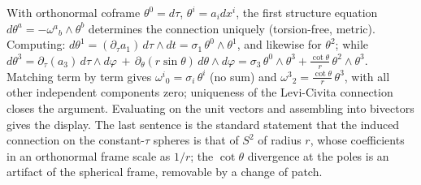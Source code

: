With orthonormal coframe $\theta^0 = d\tau$, $\theta^i = a_i dx^i$, the first structure equation $d\theta^a = -\omega^a{}_b \wedge \theta^b$ determines the connection uniquely (torsion-free, metric). Computing: $d\theta^1 = (\partial_\tau a_1)\,d\tau \wedge dt = \sigma_1\,\theta^0 \wedge \theta^1$, and likewise for $\theta^2$; while $d\theta^3 = \partial_\tau(a_3)\,d\tau\wedge d\varphi\,+\,\partial_\theta(r\sin\theta)\,d\theta \wedge d\varphi = \sigma_3\,\theta^0\wedge\theta^3 + \frac{\cot\theta}{r}\,\theta^2 \wedge \theta^3$. Matching term by term gives $\omega^i{}_0 = \sigma_i\,\theta^i$ (no sum) and $\omega^3{}_2 = \frac{\cot\theta}{r}\,\theta^3$, with all other independent components zero; uniqueness of the Levi-Civita connection closes the argument. Evaluating on the unit vectors and assembling into bivectors gives the display. The last sentence is the standard statement that the induced connection on the constant-$\tau$ spheres is that of $S^2$ of radius $r$, whose coefficients in an orthonormal frame scale as $1/r$; the $\cot\theta$ divergence at the poles is an artifact of the spherical frame, removable by a change of patch.
